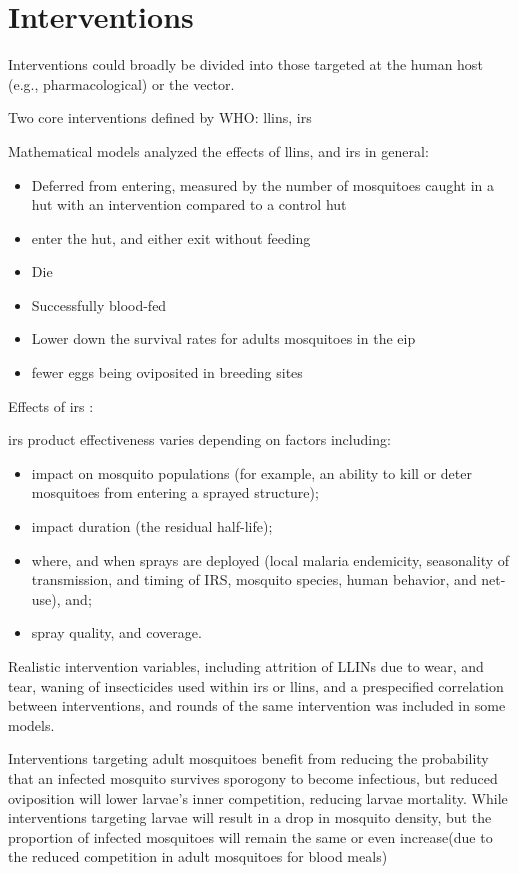 \documentclass[a4paper, 12pt, twoside]{article}
\begin{document}
\section{Interventions}
Interventions could broadly be divided into those targeted at the human host (e.g., pharmacological) or the vector.

Two core interventions defined by WHO: \gls{llins}, \gls{irs}

Mathematical models analyzed the effects of \gls{llins}, and \gls{irs} in general:

\begin{itemize}
	\item Deferred from entering, measured by the number of mosquitoes caught in a hut with an intervention compared to a control hut
	\item enter the hut, and either exit without feeding
	\item Die
	\item Successfully blood-fed
	\item Lower down the survival rates for adults mosquitoes in the \gls{eip}
	\item fewer eggs being oviposited in breeding sites
\end{itemize}

Effects of \gls{irs} \cite{Sherrard-Smith2018b}:

\gls{irs} product effectiveness varies depending on factors including:

\begin{itemize}
	\item impact on mosquito populations (for example, an ability to kill or deter mosquitoes from entering a sprayed structure);
	\item impact duration (the residual half-life);
	\item where, and when sprays are deployed (local malaria endemicity, seasonality of transmission, and timing of IRS, mosquito species, human behavior, and net-use), and;
	\item spray quality, and coverage.
\end{itemize}

Realistic intervention variables, including attrition of LLINs due to wear, and tear, waning of insecticides used within \gls{irs} or \gls{llins}, and a prespecified correlation between interventions, and rounds of the same intervention was included in some models\cite{Walker2016}.

Interventions targeting adult mosquitoes benefit from reducing the probability that an infected mosquito survives sporogony to become infectious, but reduced oviposition will lower larvae's inner competition, reducing larvae mortality.
While interventions targeting larvae will result in a drop in mosquito density, but the proportion of infected mosquitoes will remain the same or even increase(due to the reduced competition in adult mosquitoes for blood meals)
\end{document}
